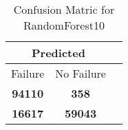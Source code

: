 \begin{table}[] 
\caption{Confusion Matric for RandomForest10} 
\label{Table: Prediction Accuracy-DMDRandomForest10OnlySunEKF-ignoreReflectionEKF-top2perfectNoFailurePrediction-Reflection} 
\centering 
\begin{tabular} 
 {@{}ccc@{}} 
\toprule 
\multicolumn{2}{c}{\textbf{Predicted}}
 \\ \midrule 
\multicolumn{1}{|c|}{Failure} & 
\multicolumn{1}{c|}{No Failure}
 \\ \midrule 
\multicolumn{1}{|c|}{\color{green}\textbf{94110}} & 
\multicolumn{1}{c|}{\color{red}\textbf{358}}
 \\ \midrule 
\multicolumn{1}{|c|}{\color{red}\textbf{16617}} & 
\multicolumn{1}{c|}{\color{green}\textbf{59043}}
 \\ \bottomrule 
\end{tabular} 
\end{table} 
